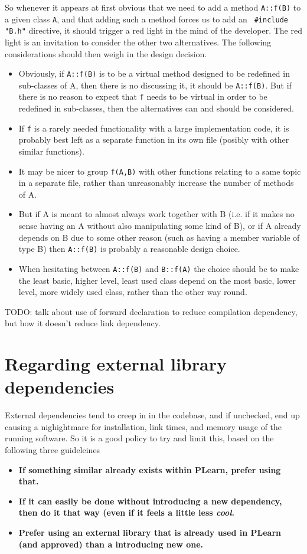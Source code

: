 \documentclass[11pt]{book}
\begin{document}
So whenever it appears at first obvious that we need to add a method
{\tt A::f(B)} to a
given class {\tt A}, and that adding such a method forces us to add an {\tt
\#include "B.h"} directive, it should trigger a red light in the mind of the
developer. The red light is an invitation to consider the other two alternatives. The
following considerations should then weigh in the design decision.
\begin{itemize}
\item Obviously, if {\tt A::f(B)} is to be a virtual method designed to be
  redefined in sub-classes of A, then there is no discussing it, it should be
  {\tt A::f(B)}. But if there is no reason to expect that {\tt f} needs to
  be virtual in order to be redefined in sub-classes, then the
  alternatives can and should be considered.
\item If {\tt f} is a rarely needed functionality with a large
  implementation code, it is probably best left as a separate function in
  its own file (posibly with other similar functions).
\item It may be nicer to group {\tt f(A,B)} with other functions relating
  to a same topic in a separate file, rather than unreasonably increase the
  number of methods of A.
\item But if A is meant to almost always work together with B (i.e. if it
  makes no sense having an A without also manipulating some kind of B), or
  if A already depends on B due to some other reason (such as having a
  member variable of type B) then
  {\tt A::f(B)} is probably a reasonable design choice. 
\item When hesitating between {\tt A::f(B)} and {\tt B::f(A)} the choice
  should be to make the least basic, higher level, least used class depend
  on the most basic, lower level, more widely used class, rather than the
  other way round.
\end{itemize}

TODO: talk about use of forward declaration to reduce compilation dependency,
but how it doesn't reduce link dependency.

\section{Regarding external library dependencies}

External dependencies tend to creep in in the codebase, and if unchecked, end up causing
a nighightmare for installation, link times, and memory usage of the
running software. So it is a good policy to try and limit this, based on
the following three guideleines
\begin{itemize}
\item {\bf If something similar already exists within PLearn, prefer using that.}
\item {\bf If it can easily be done without introducing a new dependency, then
  do it that way (even if it feels a little less {\em cool}.}
\item {\bf Prefer using an external library that is already used in PLearn
(and approved) than a introducing new one.} 
\end{itemize}
\end{document}

